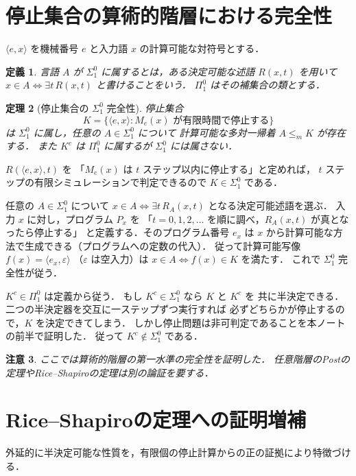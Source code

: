 \documentclass[a5paper,10pt,onecolumn]{jsarticle}
\makeatletter
\theoremstyle{mathnotetheorem}
\newtheorem{theorem}{定理}[section]
\newtheorem{definition}[theorem]{定義}
\newtheorem{remark}[theorem]{注意}
\renewcommand{\proofname}{証明}
\renewenvironment{proof}[1][\proofname]{%
  \par\pushQED{\qed}\normalfont\topsep4\p@\@plus2\p@\relax
  \trivlist\item[\hskip\labelsep\bfseries #1]\ignorespaces
}{\popQED\endtrivlist\@endpefalse}
\makeatother
\begin{document}
\section{停止集合の算術的階層における完全性}
$\langle e,x\rangle$ を機械番号 $e$ と入力語 $x$ の計算可能な対符号とする．
\begin{definition}
言語 $A$ が $\Sigma^0_1$ に属するとは，ある決定可能な述語
$R(x,t)$ を用いて $x\in A\iff\exists t\,R(x,t)$ と書けることをいう．
$\Pi^0_1$ はその補集合の類とする．
\end{definition}
\begin{theorem}[停止集合の $\Sigma^0_1$ 完全性]
停止集合
\[
 K=\{\langle e,x\rangle:M_e(x)\text{ が有限時間で停止する}\}
\]
は $\Sigma^0_1$ に属し，任意の $A\in\Sigma^0_1$ について
計算可能な多対一帰着 $A\le_mK$ が存在する．
また $K^c$ は $\Pi^0_1$ に属するが $\Sigma^0_1$ には属さない．
\end{theorem}
\begin{proof}
$R(\langle e,x\rangle,t)$ を
「$M_e(x)$ は $t$ ステップ以内に停止する」と定めれば，
$t$ ステップの有限シミュレーションで判定できるので
$K\in\Sigma^0_1$ である．

任意の $A\in\Sigma^0_1$ について
$x\in A\iff\exists t\,R_A(x,t)$ となる決定可能述語を選ぶ．
入力 $x$ に対し，プログラム $P_x$ を
「$t=0,1,2,\ldots$ を順に調べ，$R_A(x,t)$ が真となったら停止する」
と定義する．そのプログラム番号 $e_x$ は
$x$ から計算可能な方法で生成できる（プログラムへの定数の代入）．
従って計算可能写像 $f(x)=\langle e_x,\varepsilon\rangle$
（$\varepsilon$ は空入力）は
$x\in A\iff f(x)\in K$ を満たす．
これで $\Sigma^0_1$ 完全性が従う．

$K^c\in\Pi^0_1$ は定義から従う．
もし $K^c\in\Sigma^0_1$ なら $K$ と $K^c$ を
共に半決定できる．二つの半決定器を交互に一ステップずつ実行すれば
必ずどちらかが停止するので，$K$ を決定できてしまう．
しかし停止問題は非可判定であることを本ノートの前半で証明した．
従って $K^c\notin\Sigma^0_1$ である．
\end{proof}
\begin{remark}
ここでは算術的階層の第一水準の完全性を証明した．
任意階層のPostの定理やRice--Shapiroの定理は別の論証を要する．
\end{remark}

\section{Rice--Shapiroの定理への証明増補}
外延的に半決定可能な性質を，有限個の停止計算からの正の証拠により特徴づける．
\end{document}

